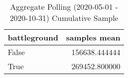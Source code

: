 \begin{table}
\centering
\caption{Aggregate Polling (2020-05-01 - 2020-10-31) Cumulative Sample}
\label{table:aggregate\_polling\_2020-05-01\_-\_2020-10-31\_cumulative\_sample}
\begin{tabular}{lr}
\toprule
 battleground &   samples mean \\
\midrule
        False &  156638.444444 \\
         True &  269452.800000 \\
\bottomrule
\end{tabular}
\end{table}
